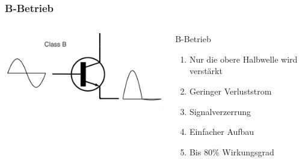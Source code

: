 \begin{frame}
  \frametitle{B-Betrieb}
  \begin{columns}[c]
    \begin{center}
      \includegraphics[width=1\textwidth,height=.8\textheight,keepaspectratio]{a07/Electronic_Amplifier_Class_B_fixed.png}\\
      {\tiny \hyperlink{refs}{\cite{wm}}}
    \end{center}
    \begin{block}{B-Betrieb}
      \begin{enumerate} 
        \item Nur die obere Halbwelle wird verstärkt
        \item Geringer Verluststrom
        \item Signalverzerrung
        \item Einfacher Aufbau
        \item Bis $80\%$ Wirkungsgrad
      \end{enumerate}
    \end{block}
  \end{columns}
\end{frame}

